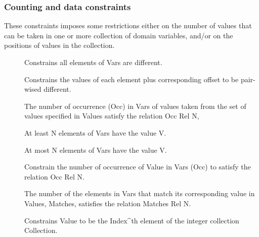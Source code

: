\subsubsection{Counting and data constraints}

These constraints imposes some restrictions either on the number of
 values that can be taken in one or more collection of domain
 variables, and/or on the positions of values in the collection.
\begin{description}
\item[]
Constrains all elements of Vars are different.

\item[]
Constrains the values of each element plus corresponding offset to be pair-wised different.

\item[]
The number of occurrence (Occ) in Vars of values taken from the set of
values specified in Values satisfy  the relation Occ Rel N,

\item[]
At least N elements of Vars have the value V.

\item[]
At most N elements of Vars have the value V.

\item[]
Constrain the number of occurrence of Value in Vars (Occ) to satisfy
the relation Occ Rel N.

\item[]
The number of the elements in Vars that
 match its corresponding value in Values, Matches, satisfies the
 relation Matches Rel N.

\item[]
Constrains Value to be the Index^{th} element of the integer collection Collection.


\end{description}
